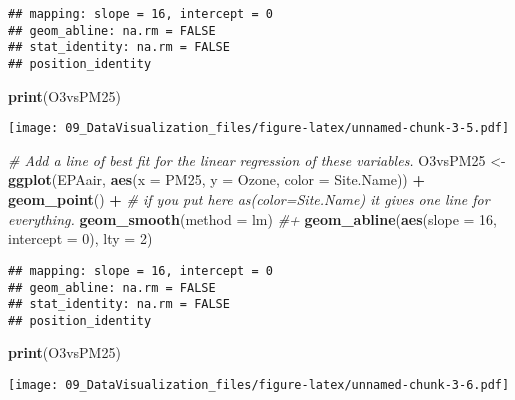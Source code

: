 \documentclass[]{article}
\newenvironment{Shaded}{\begin{snugshade}}{\end{snugshade}}
\newcommand{\KeywordTok}[1]{\textcolor[rgb]{0.13,0.29,0.53}{\textbf{#1}}}
\newcommand{\DataTypeTok}[1]{\textcolor[rgb]{0.13,0.29,0.53}{#1}}
\newcommand{\DecValTok}[1]{\textcolor[rgb]{0.00,0.00,0.81}{#1}}
\newcommand{\StringTok}[1]{\textcolor[rgb]{0.31,0.60,0.02}{#1}}
\newcommand{\CommentTok}[1]{\textcolor[rgb]{0.56,0.35,0.01}{\textit{#1}}}
\newcommand{\OperatorTok}[1]{\textcolor[rgb]{0.81,0.36,0.00}{\textbf{#1}}}
\newcommand{\NormalTok}[1]{#1}
\begin{document}
\begin{verbatim}
## mapping: slope = 16, intercept = 0 
## geom_abline: na.rm = FALSE
## stat_identity: na.rm = FALSE
## position_identity
\end{verbatim}

\begin{Shaded}
\begin{Highlighting}[]
\KeywordTok{print}\NormalTok{(O3vsPM25)}
\end{Highlighting}
\end{Shaded}

\texttt{[image: 09\_DataVisualization\_files/figure-latex/unnamed-chunk-3-5.pdf]}

\begin{Shaded}
\begin{Highlighting}[]
\CommentTok{# Add a line of best fit for the linear regression of these variables.}
\NormalTok{O3vsPM25 <-}
\StringTok{  }\KeywordTok{ggplot}\NormalTok{(EPAair, }\KeywordTok{aes}\NormalTok{(}\DataTypeTok{x =}\NormalTok{ PM25, }\DataTypeTok{y =}\NormalTok{ Ozone, }\DataTypeTok{color =}\NormalTok{ Site.Name)) }\OperatorTok{+}
\StringTok{  }\KeywordTok{geom_point}\NormalTok{() }\OperatorTok{+}\StringTok{ }\CommentTok{# if you put here as(color=Site.Name) it gives one line for everything.}
\StringTok{  }\KeywordTok{geom_smooth}\NormalTok{(}\DataTypeTok{method =}\NormalTok{ lm) }\CommentTok{#+ }
  \KeywordTok{geom_abline}\NormalTok{(}\KeywordTok{aes}\NormalTok{(}\DataTypeTok{slope =} \DecValTok{16}\NormalTok{, }\DataTypeTok{intercept =} \DecValTok{0}\NormalTok{), }\DataTypeTok{lty =} \DecValTok{2}\NormalTok{) }
\end{Highlighting}
\end{Shaded}

\begin{verbatim}
## mapping: slope = 16, intercept = 0 
## geom_abline: na.rm = FALSE
## stat_identity: na.rm = FALSE
## position_identity
\end{verbatim}

\begin{Shaded}
\begin{Highlighting}[]
\KeywordTok{print}\NormalTok{(O3vsPM25)}
\end{Highlighting}
\end{Shaded}

\texttt{[image: 09\_DataVisualization\_files/figure-latex/unnamed-chunk-3-6.pdf]}

\begin{Shaded}
\end{Shaded}
\end{document}
